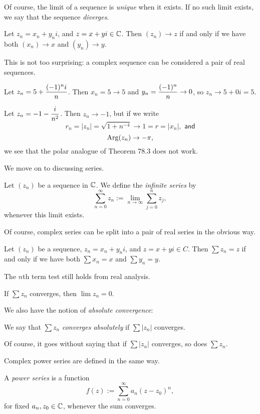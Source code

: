 \documentclass{article}
\begin{document}
Of course, the limit of a sequence is \textit{unique} when it exists. If no such limit exists, we say that the sequence \textit{diverges}.
\begin{theorem}
Let $z_n = x_n + y_ni$, and $z=x+yi\in\mathbb C$. Then $(z_n)\to z$ if and only if we have both $(x_n) \to x$ and $(y_n)\to y$.
\end{theorem}
This is not too surprising: a complex sequence can be considered a pair of real sequences.
\begin{example}
Let $z_n = \displaystyle 5 + \frac{(-1)^ni}n$. Then $x_n = 5\to 5$ and $y_n = \displaystyle\frac{(-1)^n}n\to 0$, so $z_n\to 5+0i = 5$.
\end{example}
\begin{example}
Let $z_n = -1 - \displaystyle\frac i{n^2}$. Then $z_n\to -1$, but if we write
$$r_n = |z_n| = \sqrt{1+n^{-4}} \to 1 = r = |x_n|, \textsf{ and}$$
$$\operatorname{Arg}(z_n)\to -\pi,$$
we see that the polar analogue of Theorem 78.3 does not work.
\end{example}
We move on to discussing series.
\begin{definition}
Let $(z_n)$ be a sequence in $\mathbb C$. We define the \textit{infinite series} by
$$\sum_{n=0}^\infty z_n := \lim_{n\to\infty} \sum_{j=0}^n z_j,$$
whenever this limit exists.
\end{definition}
Of course, complex series can be split into a pair of real series in the obvious way.
\begin{theorem}
Let $(z_n)$ be a sequence, $z_n = x_n + y_ni$, and $z = x+yi\in C$. Then $\sum z_n = z$ if and only if we have both $\sum x_n = x$ and $\sum y_n =y$.
\end{theorem}
The $n$th term test still holds from real analysis.
\begin{corollary}
If $\sum z_n$ converges, then $\lim z_n = 0$.
\end{corollary}

We also have the notion of \textit{absolute convergence}:
\begin{definition}
We say that $\sum z_n$ \textit{converges absolutely} if $\sum |z_n|$ converges.
\end{definition}
Of course, it goes without saying that if $\sum |z_n|$ converges, so does $\sum z_n$.
\vspace{0.2 cm}

Complex power series are defined in the same way.
\begin{definition}
A \textit{power series} is a function
$$f(z) := \sum_{n=0}^\infty a_n(z-z_0)^n,$$
for fixed $a_n, z_0\in\mathbb C$, whenever the sum converges.
\end{definition}
\setcounter{section}{79}
\end{document}
